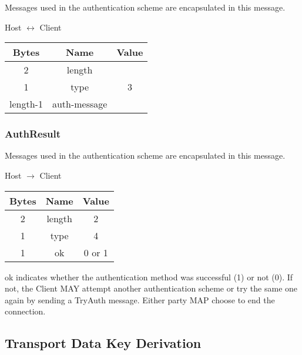Messages used in the authentication scheme are encapsulated in this message.

\begin{center}
    Host $\leftrightarrow$ Client\\
    \begin{tabular}{|c|c|c|}
        \hline
        \textbf{Bytes} & \textbf{Name} & \textbf{Value} \\
        \hline
        2              & length        &                \\
        \hline
        1              & type          & 3              \\
        \hline
        length-1       & auth-message  &                \\
        \hline
    \end{tabular}
\end{center}

\subsubsection{AuthResult}

Messages used in the authentication scheme are encapsulated in this message.

\begin{center}
    Host $\rightarrow$ Client\\
    \begin{tabular}{|c|c|c|}
        \hline
        \textbf{Bytes} & \textbf{Name} & \textbf{Value} \\
        \hline
        2              & length        & 2              \\
        \hline
        1              & type          & 4              \\
        \hline
        1              & ok            & 0 or 1         \\
        \hline
    \end{tabular}
\end{center}

ok indicates whether the authentication method was successful (1) or not (0). If not, the Client MAY attempt another authentication scheme or try the same one again by sending a TryAuth message. Either party MAP choose to end the connection.

\subsection{Transport Data Key Derivation}

